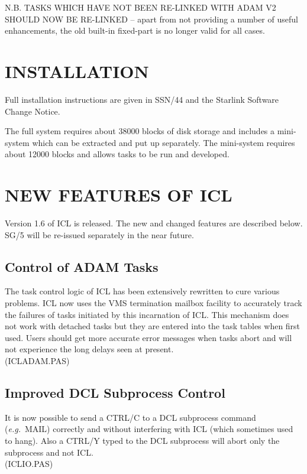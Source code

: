 N.B. TASKS WHICH HAVE NOT BEEN RE-LINKED WITH ADAM V2 SHOULD NOW BE RE-LINKED
-- apart from not providing a number of useful enhancements, the old built-in
fixed-part is no longer valid for all cases.

\newpage
  \setlength{\parskip}{0mm}
  \tableofcontents
  \setlength{\parskip}{\medskipamount}
  \markright{\stardocname}

\section{INSTALLATION}
Full installation instructions are given in SSN/44 and the Starlink Software 
Change Notice.

The full system requires about 38000 blocks of disk storage and includes a
mini-system which can be extracted and put up separately. The mini-system
requires about 12000 blocks and allows tasks to be run and  developed.

\section{NEW FEATURES OF ICL}
Version 1.6 of ICL is released. The new and changed features are described
below. SG/5 will be re-issued separately in the near future.

\subsection{Control of ADAM Tasks}
The task control logic of ICL has been extensively rewritten to cure various
problems. ICL now uses the VMS termination mailbox facility to accurately
track the failures of tasks initiated by this incarnation of ICL. This
mechanism does not work with detached tasks but they are entered into the task
tables when first used. Users should get more accurate error messages when
tasks abort and will not experience the long delays seen at present.\\
(ICLADAM.PAS)
\subsection{Improved DCL Subprocess Control}
It is now possible to send a CTRL/C to a DCL subprocess command 
({\em e.g.}\ MAIL)
correctly and without interfering with ICL (which sometimes used to hang).
Also a CTRL/Y typed to the DCL subprocess will abort only the subprocess and 
not ICL.\\
(ICLIO.PAS)

